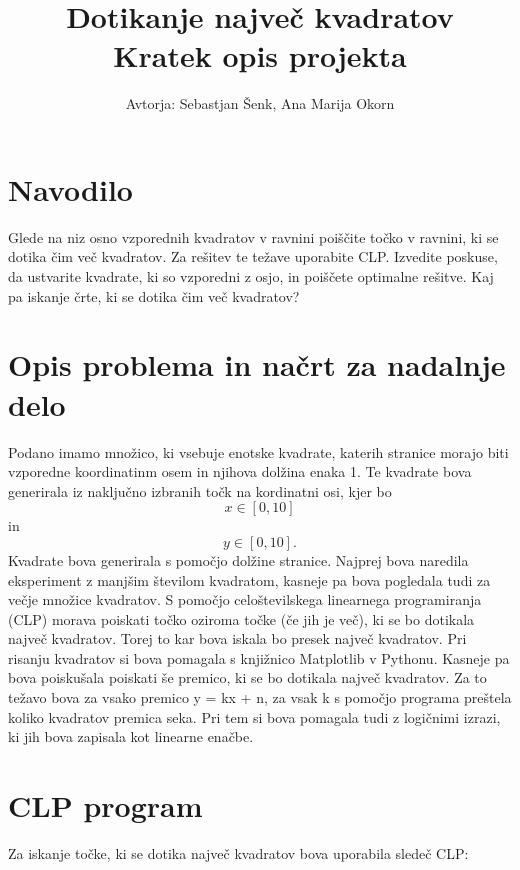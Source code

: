 \documentclass[a4, 12pt]{article}
\begin{document}
\title{ Dotikanje največ kvadratov  \\
  \large Kratek opis projekta}

\author{Avtorja: Sebastjan Šenk, Ana Marija Okorn}

\maketitle

\section{Navodilo}

Glede na niz osno vzporednih kvadratov v ravnini poiščite točko v ravnini,
ki se dotika čim več kvadratov. Za rešitev te težave uporabite CLP. 
Izvedite poskuse, da ustvarite kvadrate, ki so vzporedni z osjo, 
in poiščete optimalne rešitve. Kaj pa iskanje črte, ki se dotika čim več 
kvadratov? 

\section{Opis problema in načrt za nadalnje delo}

Podano imamo množico, ki vsebuje enotske kvadrate, katerih stranice
morajo biti vzporedne koordinatinm osem in njihova dolžina enaka 1. 
Te kvadrate bova generirala iz naključno izbranih točk na kordinatni osi, 
kjer bo\[ x \in [0,10]\] in \[y \in [0,10].\] Kvadrate bova generirala s 
pomočjo dolžine stranice. Najprej bova naredila eksperiment z manjšim
številom kvadratom, kasneje pa bova pogledala tudi za večje množice 
kvadratov. S pomočjo celoštevilskega linearnega programiranja (CLP)
morava poiskati točko oziroma točke (če jih je več), ki se bo dotikala 
največ kvadratov. Torej to kar bova iskala bo presek največ kvadratov. 
Pri risanju kvadratov si bova pomagala s knjižnico Matplotlib v Pythonu. 
Kasneje pa bova poiskušala poiskati še premico, ki se bo dotikala 
največ kvadratov. Za to težavo bova za vsako premico y = kx + n, 
za vsak k s pomočjo programa preštela koliko kvadratov premica seka. 
Pri tem si bova pomagala tudi z logičnimi izrazi, ki jih bova zapisala
kot linearne enačbe.

\section{CLP program}

Za iskanje točke, ki se dotika največ kvadratov bova uporabila sledeč CLP:\\
\end{document}
